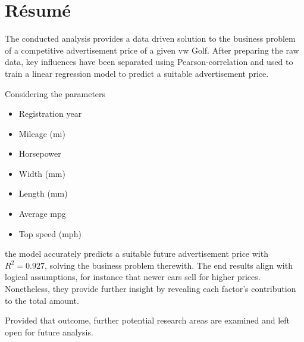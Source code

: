 \section{Résumé}

The conducted analysis provides a data driven solution to the business problem of a competitive advertisement price of a given \ac{vw} Golf.
After preparing the raw data, key influences have been separated using Pearson-correlation and used to train a linear regression model to
predict a suitable advertisement price.
\par
Considering the parameters 
\begin{itemize}
    \item Registration year
    \item Mileage (mi)
    \item Horsepower
    \item Width (mm)
    \item Length (mm)
    \item Average mpg
    \item Top speed (mph)
\end{itemize}
the model accurately predicts a suitable future advertisement price with $R^2 = 0.927$, solving the business problem therewith.
The end results align with logical assumptions, for instance that newer cars sell for higher prices.
Nonetheless, they provide further insight by revealing each factor's contribution to the total amount.
\par
Provided that outcome, further potential research areas are examined and left open for future analysis. 


